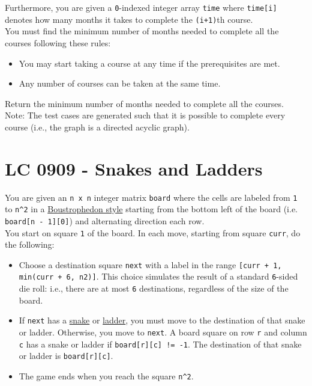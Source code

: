 Furthermore, you are given a {\colorbox{CodeBackground}{\lstinline|0|}}-indexed integer array {\colorbox{CodeBackground}{\lstinline|time|}} where {\colorbox{CodeBackground}{\lstinline|time[i]|}} denotes how many months it takes to complete the {\colorbox{CodeBackground}{\lstinline|(i+1)|}}th course.\\

You must find the minimum number of months needed to complete all the courses following these rules:
\begin{itemize}
\item You may start taking a course at any time if the prerequisites are met.
\item Any number of courses can be taken at the same time.
\end{itemize}

Return the minimum number of months needed to complete all the courses.\\

Note: The test cases are generated such that it is possible to complete every course (i.e., the graph is a directed acyclic graph).

\section{LC 0909 - Snakes and Ladders}
You are given an {\colorbox{CodeBackground}{\lstinline|n x n|}} integer matrix {\colorbox{CodeBackground}{\lstinline|board|}} where the cells are labeled from {\colorbox{CodeBackground}{\lstinline|1|}} to {\colorbox{CodeBackground}{\lstinline|n^2|}} in a \ul{Boustrophedon style} starting from the bottom left of the board (i.e. {\colorbox{CodeBackground}{\lstinline|board[n - 1][0]|}}) and alternating direction each row.\\

You start on square {\colorbox{CodeBackground}{\lstinline|1|}} of the board. In each move, starting from square {\colorbox{CodeBackground}{\lstinline|curr|}}, do the following:
\begin{itemize}
	\item Choose a destination square {\colorbox{CodeBackground}{\lstinline|next|}} with a label in the range {\colorbox{CodeBackground}{\lstinline|[curr + 1, min(curr + 6, n2)]|}}. This choice simulates the result of a standard {\colorbox{CodeBackground}{\lstinline|6|}}-sided die roll: i.e., there are at most {\colorbox{CodeBackground}{\lstinline|6|}} destinations, regardless of the size of the board.
	\item If {\colorbox{CodeBackground}{\lstinline|next|}} has a \ul{snake} or \ul{ladder}, you must move to the destination of that snake or ladder. Otherwise, you move to {\colorbox{CodeBackground}{\lstinline|next|}}. A board square on row {\colorbox{CodeBackground}{\lstinline|r|}} and column {\colorbox{CodeBackground}{\lstinline|c|}} has a snake or ladder if {\colorbox{CodeBackground}{\lstinline|board[r][c] != -1|}}. The destination of that snake or ladder is {\colorbox{CodeBackground}{\lstinline|board[r][c]|}}.
	\item The game ends when you reach the square {\colorbox{CodeBackground}{\lstinline|n^2|}}.
\end{itemize}

